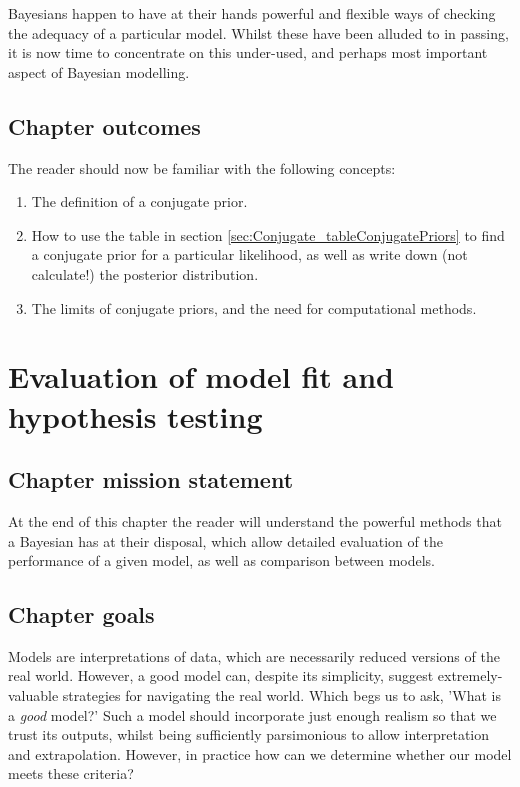 \documentclass[11pt,fullpage]{book}
\begin{document}
Bayesians happen to have at their hands powerful and flexible ways of checking the adequacy of a particular model. Whilst these have been alluded to in passing, it is now time to concentrate on this under-used, and perhaps most important aspect of Bayesian modelling. 

\section{Chapter outcomes}
The reader should now be familiar with the following concepts:

\begin{enumerate}
\item The definition of a conjugate prior.
\item How to use the table in section \ref{sec:Conjugate_tableConjugatePriors} to find a conjugate prior for a particular likelihood, as well as write down (not calculate!) the posterior distribution.
\item The limits of conjugate priors, and the need for computational methods.
\end{enumerate}


\chapter{Evaluation of model fit and hypothesis testing}\label{chap:ModelFit}
\section{Chapter mission statement}
At the end of this chapter the reader will understand the powerful methods that a Bayesian has at their disposal, which allow detailed evaluation of the performance of a given model, as well as comparison between models.

\section{Chapter goals}
Models are interpretations of data, which are necessarily reduced versions of the real world. However, a good model can, despite its simplicity, suggest extremely-valuable strategies for navigating the real world. Which begs us to ask, 'What is a \textit{good} model?' Such a model should incorporate just enough realism so that we trust its outputs, whilst being sufficiently parsimonious to allow interpretation and extrapolation. However, in practice how can we determine whether our model meets these criteria? 
\end{document}

